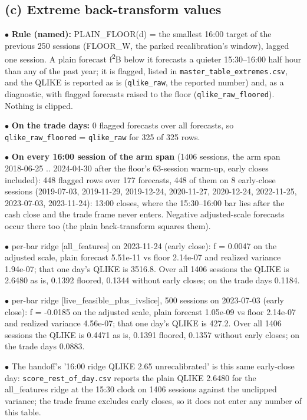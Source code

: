 \documentclass[10pt]{article}
\begin{document}
\subsection*{(c) Extreme back-transform values}
$\bullet$ \textbf{Rule (named):} PLAIN\_FLOOR(d) = the smallest 16:00 target of the previous 250 sessions (FLOOR\_W, the parked recalibration's window), lagged one session. A plain forecast f\textsuperscript{2}\textperiodcentered{}B below it forecasts a quieter 15:30--16:00 half hour than any of the past year; it is flagged, listed in \texttt{master\_table\_extremes.csv}, and the QLIKE is reported as is (\texttt{qlike\_raw}, the reported number) and, as a diagnostic, with flagged forecasts raised to the floor (\texttt{qlike\_raw\_floored}). Nothing is clipped.\par
$\bullet$ \textbf{On the trade days:} 0 flagged forecasts over all forecasts, so \texttt{qlike\_raw\_floored} = \texttt{qlike\_raw} for 325 of 325 rows.\par
$\bullet$ \textbf{On every 16:00 session of the arm span} (1406 sessions, the arm span 2018-06-25 .. 2024-04-30 after the floor's 63-session warm-up, early closes included): 448 flagged rows over 177 forecasts, 448 of them on 8 early-close sessions (2019-07-03, 2019-11-29, 2019-12-24, 2020-11-27, 2020-12-24, 2022-11-25, 2023-07-03, 2023-11-24): 13:00 closes, where the 15:30--16:00 bar lies after the cash close and the trade frame never enters. Negative adjusted-scale forecasts occur there too (the plain back-transform squares them).\par
$\bullet$ per-bar ridge [all\_features] on 2023-11-24 (early close): f = 0.0047 on the adjusted scale, plain forecast 5.51e-11 vs floor 2.14e-07 and realized variance 1.94e-07; that one day's QLIKE is 3516.8. Over all 1406 sessions the QLIKE is 2.6480 as is, 0.1392 floored, 0.1344 without early closes; on the trade days 0.1184.\par
$\bullet$ per-bar ridge [live\_feasible\_plus\_ivslice], 500 sessions on 2023-07-03 (early close): f = -0.0185 on the adjusted scale, plain forecast 1.05e-09 vs floor 2.14e-07 and realized variance 4.56e-07; that one day's QLIKE is 427.2. Over all 1406 sessions the QLIKE is 0.4471 as is, 0.1391 floored, 0.1357 without early closes; on the trade days 0.0883.\par
$\bullet$ The handoff's '16:00 ridge QLIKE 2.65 unrecalibrated' is this same early-close day: \texttt{score\_rest\_of\_day.csv} reports the plain QLIKE 2.6480 for the all\_features ridge at the 15:30 clock on 1406 sessions against the unclipped variance; the trade frame excludes early closes, so it does not enter any number of this table.\par
\end{document}
